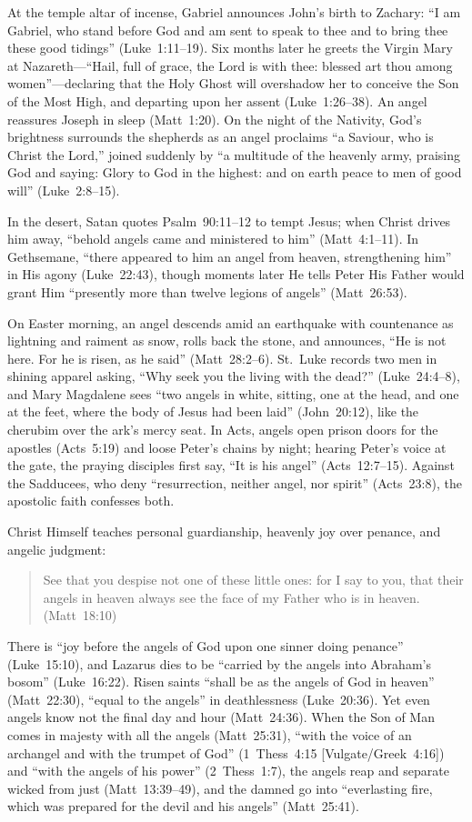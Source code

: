 At the temple altar of incense, Gabriel announces John's birth to Zachary: ``I am Gabriel, who stand before God and am sent to speak to thee and to bring thee these good tidings'' (Luke~1:11--19). Six months later he greets the Virgin Mary at Nazareth---``Hail, full of grace, the Lord is with thee: blessed art thou among women''---declaring that the Holy Ghost will overshadow her to conceive the Son of the Most High, and departing upon her assent (Luke~1:26--38). An angel reassures Joseph in sleep (Matt~1:20). On the night of the Nativity, God's brightness surrounds the shepherds as an angel proclaims ``a Saviour, who is Christ the Lord,'' joined suddenly by ``a multitude of the heavenly army, praising God and saying: Glory to God in the highest: and on earth peace to men of good will'' (Luke~2:8--15).

In the desert, Satan quotes Psalm~90:11--12 to tempt Jesus; when Christ drives him away, ``behold angels came and ministered to him'' (Matt~4:1--11). In Gethsemane, ``there appeared to him an angel from heaven, strengthening him'' in His agony (Luke~22:43), though moments later He tells Peter His Father would grant Him ``presently more than twelve legions of angels'' (Matt~26:53).

On Easter morning, an angel descends amid an earthquake with countenance as lightning and raiment as snow, rolls back the stone, and announces, ``He is not here. For he is risen, as he said'' (Matt~28:2--6). St.~Luke records two men in shining apparel asking, ``Why seek you the living with the dead?'' (Luke~24:4--8), and Mary Magdalene sees ``two angels in white, sitting, one at the head, and one at the feet, where the body of Jesus had been laid'' (John~20:12), like the cherubim over the ark's mercy seat. In Acts, angels open prison doors for the apostles (Acts~5:19) and loose Peter's chains by night; hearing Peter's voice at the gate, the praying disciples first say, ``It is his angel'' (Acts~12:7--15). Against the Sadducees, who deny ``resurrection, neither angel, nor spirit'' (Acts~23:8), the apostolic faith confesses both.

Christ Himself teaches personal guardianship, heavenly joy over penance, and angelic judgment:
\begin{quotation}
See that you despise not one of these little ones: for I say to you, that their angels in heaven always see the face of my Father who is in heaven. (Matt~18:10)
\end{quotation}
There is ``joy before the angels of God upon one sinner doing penance'' (Luke~15:10), and Lazarus dies to be ``carried by the angels into Abraham's bosom'' (Luke~16:22). Risen saints ``shall be as the angels of God in heaven'' (Matt~22:30), ``equal to the angels'' in deathlessness (Luke~20:36). Yet even angels know not the final day and hour (Matt~24:36). When the Son of Man comes in majesty with all the angels (Matt~25:31), ``with the voice of an archangel and with the trumpet of God'' (1~Thess~4:15 [Vulgate/Greek~4:16]) and ``with the angels of his power'' (2~Thess~1:7), the angels reap and separate wicked from just (Matt~13:39--49), and the damned go into ``everlasting fire, which was prepared for the devil and his angels'' (Matt~25:41).

